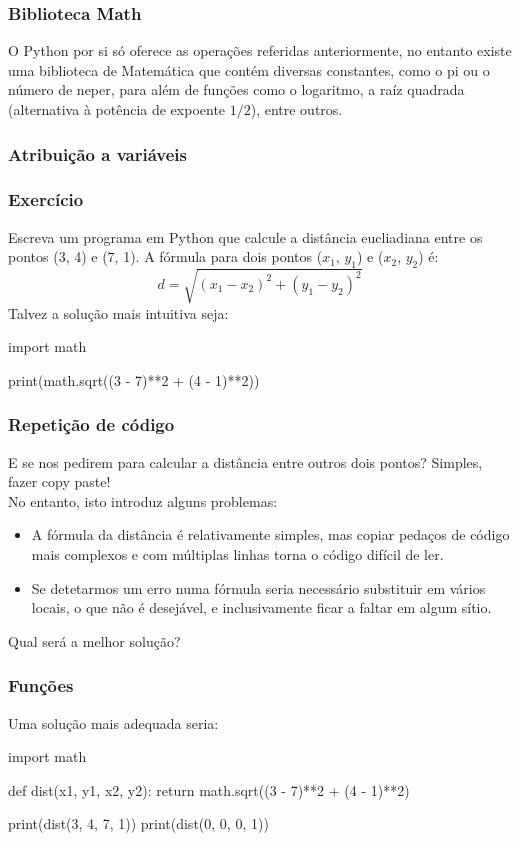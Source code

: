 \documentclass{beamer}
\begin{document}
\begin{frame}
    \frametitle{Biblioteca Math}
    O Python por si só oferece as operações referidas anteriormente, no entanto
    existe uma biblioteca de Matemática que contém diversas constantes, como o 
    pi ou o número de neper, para além de funções como o logaritmo, a raíz
    quadrada (alternativa à potência de expoente $1/2$), entre outros.
\end{frame}

\begin{frame}
    \frametitle{Atribuição a variáveis}
\end{frame}

\begin{frame}[containsverbatim]
    \frametitle{Exercício}
    Escreva um programa em Python que calcule a distância eucliadiana entre 
    os pontos (3, 4) e (7, 1). A fórmula para dois pontos ($x_1$, $y_1$)
    e ($x_2$, $y_2$) é:
    \vspace{2mm}
    \[ d = \sqrt{(x_1 - x_2)^2 + (y_1 - y_2)^2} \]
    \vspace{4mm}
    Talvez a solução mais intuitiva seja:
    \begin{pythonlst}
        import math

        print(math.sqrt((3 - 7)**2 + (4 - 1)**2))
    \end{pythonlst}
\end{frame}

\begin{frame}
    \frametitle{Repetição de código}
    E se nos pedirem para calcular a distância entre outros dois pontos?
    Simples, fazer copy paste!\\
    \vspace{4mm}
    No entanto, isto introduz alguns problemas:
    \begin{itemize}
        \item A fórmula da distância é relativamente simples, mas copiar pedaços 
            de código mais complexos e com múltiplas linhas torna o código 
            difícil de ler.
        \item Se detetarmos um erro numa fórmula seria necessário substituir em 
            vários locais, o que não é desejável, e inclusivamente ficar a faltar
            em algum sítio.
    \end{itemize}
    Qual será a melhor solução?
\end{frame}

\begin{frame}[containsverbatim]
    \frametitle{Funções}
    Uma solução mais adequada seria:
    \begin{pythonlst}
        import math

        def dist(x1, y1, x2, y2):
            return math.sqrt((3 - 7)**2 + (4 - 1)**2)
        
        print(dist(3, 4, 7, 1))
        print(dist(0, 0, 0, 1))
    \end{pythonlst}
\end{frame}
\end{document}
